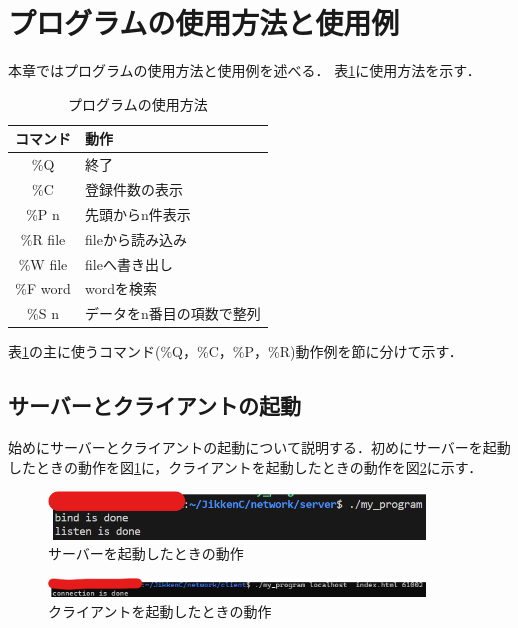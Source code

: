 \documentclass[11pt,a4j,titlepage]{jsarticle}
\begin{document}
\section{プログラムの使用方法と使用例}
本章ではプログラムの使用方法と使用例を述べる．
表\ref{tab:howtouse}に使用方法を示す．
\begin{table}[]
  \centering
  \caption{プログラムの使用方法}
  \label{tab:howtouse}
  \begin{tabular}{|c|l|}
  \hline
  コマンド     & 動作            \\ \hline
  \%Q      & 終了            \\ \hline
  \%C      & 登録件数の表示       \\ \hline
  \%P n    & 先頭からn件表示      \\ \hline
  \%R file & fileから読み込み    \\ \hline
  \%W file & fileへ書き出し     \\ \hline
  \%F word & wordを検索       \\ \hline
  \%S n    & データをn番目の項数で整列 \\ \hline
  \end{tabular}
  \end{table}

表\ref{tab:howtouse}の主に使うコマンド(\%Q，\%C，\%P，\%R)動作例を節に分けて示す．
\subsection{サーバーとクライアントの起動}
始めにサーバーとクライアントの起動について説明する．初めにサーバーを起動したときの動作を図\ref{fig:ser_sta}に，クライアントを起動したときの動作を図\ref{fig:cli_sta}に示す．
\begin{figure}[h]
\centering
\includegraphics[width=10cm]{pics/server_start.png}
\caption{サーバーを起動したときの動作}
\label{fig:ser_sta}\vspace{0zh}
\end{figure}
\begin{figure}[h]
\centering
\includegraphics[width=10cm]{pics/client_start.png}
\caption{クライアントを起動したときの動作}
\label{fig:cli_sta}\vspace{0zh}
\end{figure}
\end{document}
